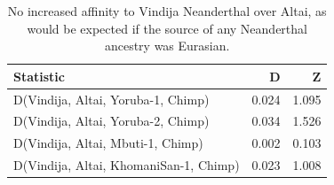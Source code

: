 \documentclass{article}
\begin{document}
\begin{table}[ht]
\centering
\begin{tabular}{lrr}
  \hline
Statistic & D & Z \\ 
  \hline
D(Vindija, Altai, Yoruba-1, Chimp) & 0.024 & 1.095 \\ 
  D(Vindija, Altai, Yoruba-2, Chimp) & 0.034 & 1.526 \\ 
  D(Vindija, Altai, Mbuti-1, Chimp) & 0.002 & 0.103 \\ 
  D(Vindija, Altai, KhomaniSan-1, Chimp) & 0.023 & 1.008 \\ 
   \hline
\end{tabular}
\caption{No increased affinity to Vindija Neanderthal over Altai, as would be expected if the source of any Neanderthal ancestry was Eurasian.} 
\label{dstats:a6}
\end{table}
\end{document}
